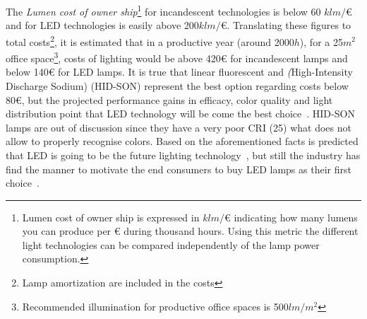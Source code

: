 The \emph{Lumen cost of owner ship}\footnote{Lumen cost of owner ship is expressed in $klm/$€ indicating how many lumens you can produce per € during thousand hours. Using this metric the different light technologies can be compared independently of the lamp power consumption.} for incandescent technologies is below 60 $klm/$€ and for LED technologies is easily above 200$klm/$€. Translating these figures to total costs\footnote{Lamp amortization are included in the costs}, it is estimated that in a productive year (around 2000$h$), for a 25$ m^2 $  office space\footnote{Recommended illumination for productive office spaces is 500$ lm/m^2 $}, costs of lighting would be above 420€ for incandescent lamps and below 140€ for LED lamps. It is true that linear fluorescent and \emph(High-Intensity Discharge Sodium) (HID-SON) represent the best option regarding costs below 80€, but the projected performance gains in efficacy, color quality and light distribution point that LED technology will be come the best choice~\cite{14Braga}. HID-SON lamps are out of discussion since they  have a very poor CRI (25) what does not allow to properly recognise colors. Based on the aforementioned facts is predicted that LED is going to be the future lighting technology~\cite{13Uken,14USDoE}, but still the industry has find the manner to motivate the end consumers to buy LED lamps as their first choice~\cite{11Voger}.


